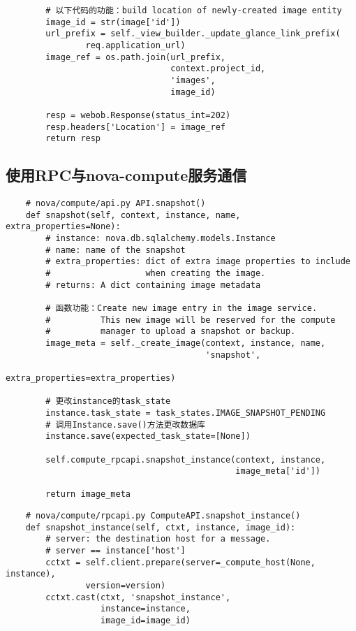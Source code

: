 \documentclass[a4paper,left=1.5cm,right=1.5cm,11pt]{article}
\begin{document}
\begin{lstlisting}
        # 以下代码的功能：build location of newly-created image entity
        image_id = str(image['id'])
        url_prefix = self._view_builder._update_glance_link_prefix(
                req.application_url)
        image_ref = os.path.join(url_prefix,
                                 context.project_id,
                                 'images',
                                 image_id)

        resp = webob.Response(status_int=202)
        resp.headers['Location'] = image_ref
        return resp
    \end{lstlisting}

\subsection{使用RPC与nova-compute服务通信}

    \begin{lstlisting}
    # nova/compute/api.py API.snapshot()
    def snapshot(self, context, instance, name, extra_properties=None):
        # instance: nova.db.sqlalchemy.models.Instance
        # name: name of the snapshot
        # extra_properties: dict of extra image properties to include
        #                   when creating the image.
        # returns: A dict containing image metadata

        # 函数功能：Create new image entry in the image service.  
        #          This new image will be reserved for the compute 
        #          manager to upload a snapshot or backup.
        image_meta = self._create_image(context, instance, name,
                                        'snapshot',
                                        extra_properties=extra_properties)

        # 更改instance的task_state
        instance.task_state = task_states.IMAGE_SNAPSHOT_PENDING
        # 调用Instance.save()方法更改数据库
        instance.save(expected_task_state=[None])

        self.compute_rpcapi.snapshot_instance(context, instance,
                                              image_meta['id'])

        return image_meta
    \end{lstlisting}

    \begin{lstlisting}
    # nova/compute/rpcapi.py ComputeAPI.snapshot_instance()
    def snapshot_instance(self, ctxt, instance, image_id):
        # server: the destination host for a message.
        # server == instance['host']
        cctxt = self.client.prepare(server=_compute_host(None, instance),
                version=version)
        cctxt.cast(ctxt, 'snapshot_instance',
                   instance=instance,
                   image_id=image_id)
    \end{lstlisting}
\end{document}
